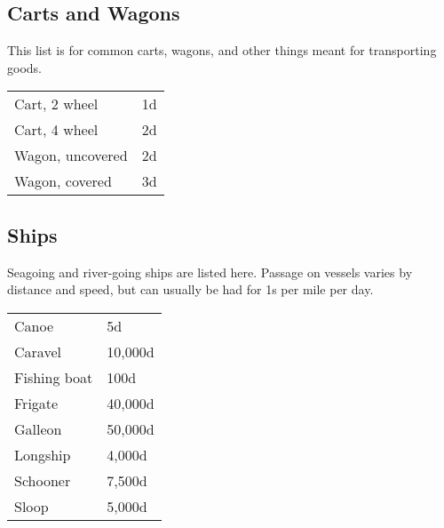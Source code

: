 \subsection{Carts and Wagons}

This list is for common carts, wagons, and other things meant for transporting goods.

\begin{center}
{
\begin{xtabular}{|l|l|}
Cart, 2 wheel & 1d \\
Cart, 4 wheel & 2d \\
Wagon, uncovered & 2d \\
Wagon, covered & 3d \\
\hline
\end{xtabular}
}
\end{center}

\subsection{Ships}

Seagoing and river-going ships are listed here. Passage on vessels varies by distance and speed,
but can usually be had for 1s per mile per day.

\begin{center}
{
\begin{xtabular}{|l|l|}
Canoe & 5d \\
Caravel & 10,000d \\
Fishing boat & 100d \\
Frigate & 40,000d \\
Galleon & 50,000d \\
Longship & 4,000d \\
Schooner & 7,500d \\
Sloop & 5,000d \\
\hline
\end{xtabular}
}
\end{center}
